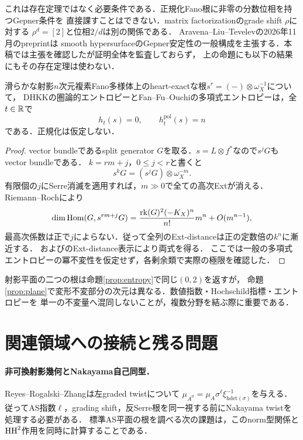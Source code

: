 \begin{remark}
これは存在定理ではなく必要条件である．正規化Fano根に非零の分数位相を持つGepner条件を
直接課すことはできない．matrix factorizationのgrade shift $\rho$に対する
$\rho^d=[2]$と位相$2/d$は別の関係である\cite{TodaGepner}．
Aravena--Liu--Tevelev\cite[Theorem 1.2]{ALT}の2026年11月のpreprintは
smooth hypersurfaceのGepner安定性の一般構成を主張する．本稿では主張を確認したが証明全体を監査しておらず，
上の命題にも以下の結果にもその存在定理は使わない．
\end{remark}

\begin{proposition}[Fano根のエントロピーは指数を区別しない]\label{prop:entropy}
滑らかな射影$n$次元複素Fano多様体上のheart-exactな根$s^r=(-)\otimes\omega_X^{-1}$について，
DHKKの圏論的エントロピーとFan--Fu--Ouchiの多項式エントロピーは，全$t\in\mathbb R$で
\[
 h_t(s)=0,\qquad h_t^{\mathrm{pol}}(s)=n
\]
である．正規化は仮定しない．
\end{proposition}
\begin{proof}
vector bundleであるsplit generator $G$を取る．$s=L\otimes f^*$なので$s^jG$もvector bundleである．
$k=rm+j$，$0\le j<r$と書くと
\[
 s^kG=(s^jG)\otimes\omega_X^{-m}.
\]
有限個の$j$にSerre消滅を適用すれば，$m\gg0$で全ての高次Extが消える．
Riemann--Rochにより
\[
 \dim\operatorname{Hom}(G,s^{rm+j}G)=
 \frac{\operatorname{rk}(G)^2(-K_X)^n}{n!}m^n+O(m^{n-1}),
\]
最高次係数は正で$j$によらない．従って全列のExt-distanceは正の定数倍の$k^n$に漸近する．
\cite[Theorem 2.6]{DHKK}および\cite[Lemma 2.7, \S6.2]{FFO}のExt-distance表示により両式を得る．
ここでは一般の多項式エントロピーの冪不変性を仮定せず，各剰余類で実際の極限を確認した．
\end{proof}

射影平面の二つの根は命題\ref{prop:entropy}で同じ$(0,2)$を返すが，
命題\ref{prop:plane}で変形不変部分の次元は異なる．数値指数・Hochschild指標・エントロピーを
単一の不変量へ混同しないことが，複数分野を結ぶ際に重要である．

\section{関連領域への接続と残る問題}
\label{sec:connections}
\paragraph{非可換射影幾何とNakayama自己同型．}
Reyes--Rogalski--Zhang\cite[Theorem 0.3]{RRZ}は左graded twistについて
$\mu_{A^{\widetilde\sigma}}=\mu_A\sigma^\ell\xi_{\mathrm{hdet}(\sigma)}^{-1}$を与える．
従ってAS指数$\ell$，grading shift，反Serre根を同一視する前にNakayama twistを処理する必要がある．
標準AS平面の根を調べる次の課題は，このnorm型関係と$\operatorname{HH}^2$作用を同時に計算することである．

